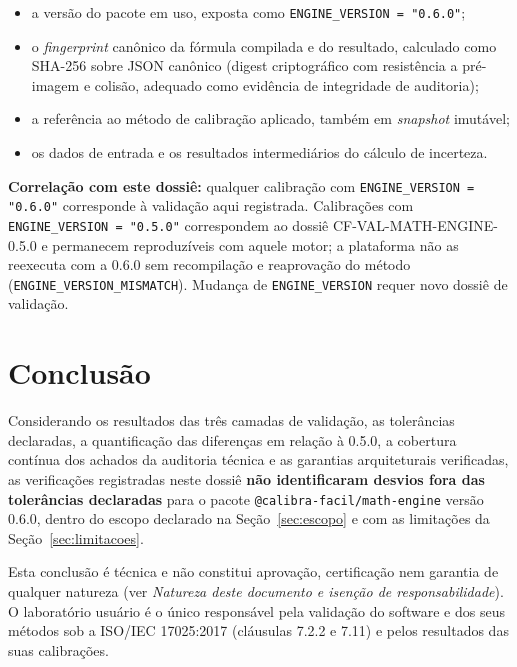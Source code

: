 \documentclass[11pt,a4paper]{article}
\newcommand{\docVersion}{0.6.0}
\newcommand{\previousVersion}{0.5.0}
\begin{document}
\begin{itemize}
  \item a versão do pacote em uso, exposta como \texttt{ENGINE\_VERSION = "\docVersion"};
  \item o \emph{fingerprint} canônico da fórmula compilada e do resultado, calculado como SHA-256 sobre JSON canônico (digest criptográfico com resistência a pré-imagem e colisão, adequado como evidência de integridade de auditoria);
  \item a referência ao método de calibração aplicado, também em \emph{snapshot} imutável;
  \item os dados de entrada e os resultados intermediários do cálculo de incerteza.
\end{itemize}

\textbf{Correlação com este dossiê:} qualquer calibração com \texttt{ENGINE\_VERSION = "\docVersion"} corresponde à validação aqui registrada. Calibrações com \texttt{ENGINE\_VERSION = "\previousVersion"} correspondem ao dossiê CF-VAL-MATH-ENGINE-0.5.0 e permanecem reproduzíveis com aquele motor; a plataforma não as reexecuta com a \docVersion{} sem recompilação e reaprovação do método (\texttt{ENGINE\_VERSION\_MISMATCH}). Mudança de \texttt{ENGINE\_VERSION} requer novo dossiê de validação.

\section{Conclusão}

Considerando os resultados das três camadas de validação, as tolerâncias declaradas, a quantificação das diferenças em relação à \previousVersion{}, a cobertura contínua dos achados da auditoria técnica e as garantias arquiteturais verificadas, as verificações registradas neste dossiê \textbf{não identificaram desvios fora das tolerâncias declaradas} para o pacote \texttt{@calibra-facil/math-engine} versão \docVersion{}, dentro do escopo declarado na Seção~\ref{sec:escopo} e com as limitações da Seção~\ref{sec:limitacoes}.

Esta conclusão é técnica e não constitui aprovação, certificação nem garantia de qualquer natureza (ver \emph{Natureza deste documento e isenção de responsabilidade}). O laboratório usuário é o único responsável pela validação do software e dos seus métodos sob a ISO/IEC 17025:2017 (cláusulas 7.2.2 e 7.11) e pelos resultados das suas calibrações.
\end{document}
